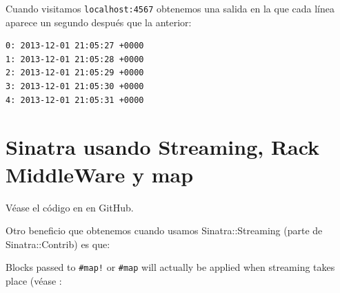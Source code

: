 Cuando visitamos \verb|localhost:4567| obtenemos una salida en la que cada línea
aparece un segundo después que la anterior:
\begin{verbatim}
0: 2013-12-01 21:05:27 +0000
1: 2013-12-01 21:05:28 +0000
2: 2013-12-01 21:05:29 +0000
3: 2013-12-01 21:05:30 +0000
4: 2013-12-01 21:05:31 +0000
\end{verbatim}

\section{Sinatra usando Streaming, Rack MiddleWare y map}

Véase el código en 
en GitHub.

Otro beneficio que obtenemos cuando usamos Sinatra::Streaming (parte de Sinatra::Contrib) es que:

Blocks passed to \verb|#map!| or 
\verb|#map| will actually be applied when streaming takes place (véase 
:

